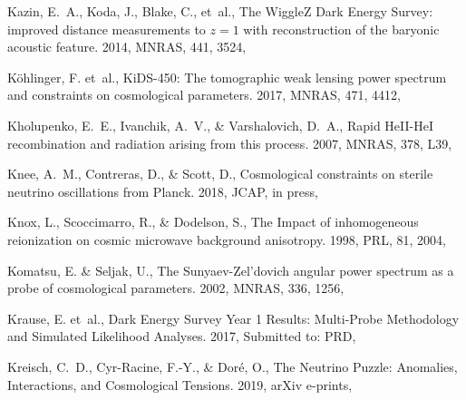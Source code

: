 \documentclass[longauth,traditabstract]{aa}
\def\mnras{{MNRAS}}
\def\prd{{PRD}}
\def\prl{{PRL}}
\def\jcap{{JCAP}}
\begin{document}
\begin{thebibliography}{379}
{Kazin}, E.~A., {Koda}, J., {Blake}, C., {et~al.}, {The WiggleZ Dark Energy
  Survey: improved distance measurements to $z = 1$ with reconstruction of the
  baryonic acoustic feature}. 2014, \mnras, 441, 3524, 

Köhlinger, F. {et~al.}, {KiDS-450: The tomographic weak lensing power spectrum
  and constraints on cosmological parameters}. 2017, \mnras, 471, 4412,

{Kholupenko}, E.~E., {Ivanchik}, A.~V., \& {Varshalovich}, D.~A., {Rapid
  HeII-HeI recombination and radiation arising from this process}. 2007,
  \mnras, 378, L39, 

{Knee}, A.~M., {Contreras}, D., \& {Scott}, D., {Cosmological constraints on
  sterile neutrino oscillations from Planck}. 2018, \jcap, in press,

Knox, L., Scoccimarro, R., \& Dodelson, S., {The Impact of inhomogeneous
  reionization on cosmic microwave background anisotropy}. 1998, \prl, 81,
  2004, 

{Komatsu}, E. \& {Seljak}, U., {The Sunyaev-Zel'dovich angular power spectrum
  as a probe of cosmological parameters}. 2002, \mnras, 336, 1256,

Krause, E. {et~al.}, {Dark Energy Survey Year 1 Results: Multi-Probe
  Methodology and Simulated Likelihood Analyses}. 2017, Submitted to: \prd,

Kreisch, C.~D., Cyr-Racine, F.-Y., \& Doré, O., {The Neutrino Puzzle:
  Anomalies, Interactions, and Cosmological Tensions}. 2019, arXiv e-prints,


\end{thebibliography}
\end{document}

